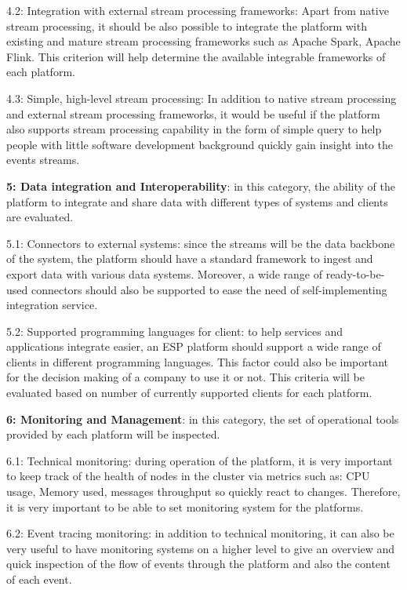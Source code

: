 4.2: Integration with external stream processing frameworks: Apart from native stream processing, it should be also possible to integrate the platform with existing and mature stream processing frameworks such as Apache Spark, Apache Flink. This criterion will help determine the available integrable frameworks of each platform.

4.3: Simple, high-level stream processing: In addition to native stream processing and external stream processing frameworks, it would be useful if the platform also supports stream processing capability in the form of simple query to help people with little software development background quickly gain insight into the events streams. 

\textbf{5: Data integration and Interoperability}: in this category, the ability of the platform to integrate and share data with different types of systems and clients are evaluated.

5.1: Connectors to external systems: since the streams will be the data backbone of the system, the platform should have a standard framework to ingest and export data with various data systems. Moreover, a wide range of ready-to-be-used connectors should also be supported to ease the need of self-implementing integration service.

5.2: Supported programming languages for client: to help services and applications integrate easier, an ESP platform should support a wide range of clients in different programming languages. This factor could also be important for the decision making of a company to use it or not. This criteria will be evaluated based on number of currently supported clients for each platform.

\textbf{6: Monitoring and Management}: in this category, the set of operational tools provided by each platform will be inspected. 

6.1: Technical monitoring: during operation of the platform, it is very important to keep track of the health of nodes in the cluster via metrics such as: CPU usage, Memory used, messages throughput so quickly react to changes. Therefore, it is very important to be able to set monitoring system for the platforms.

6.2: Event tracing monitoring: in addition to technical monitoring, it can also be very useful to have monitoring systems on a higher level to give an overview and quick inspection of the flow of events through the platform and also the content of each event.

